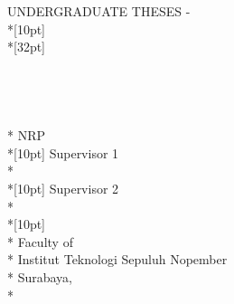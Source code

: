 \newpage
	\sffamily
	\thispagestyle{empty}
	{\noindent UNDERGRADUATE THESES - \kode } \\*[10pt]
	{\large\textbf{\MakeUppercase{\judulEnglish}}} \\*[32pt]
	\\
	\\
	\\
	\\
	\MakeUppercase{\penulis} \\*
	NRP \nrp \\*[10pt]
	Supervisor 1 \\*
	\pembimbingSatu \\*[10pt]
	Supervisor 2 \\*
	\pembimbingDua \\*[10pt]
	\MakeUppercase{\jurusanEnglish} \\*
	Faculty of \fakultasEnglish \\*
	Institut Teknologi Sepuluh Nopember \\*
	Surabaya, \tahun \\*
	\rmfamily
	\normalsize
	\restoregeometry
	\color{black}
	\cleardoublepage
